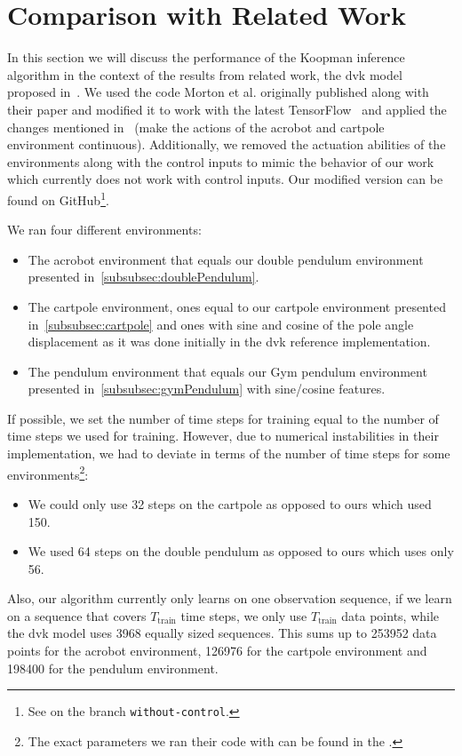 \section{Comparison with Related Work}
	In this section we will discuss the performance of the Koopman inference algorithm in the context of the results from related work, the \ac{dvk} model proposed in~\cite{mortonDeepVariationalKoopman2019a}. We used the code Morton et al. originally published along with their paper and modified it to work with the latest TensorFlow~\cite{abadiTensorFlowLargeScaleMachine2016} and applied the changes mentioned in~\cite{mortonDeepVariationalKoopman2019a} (\ie make the actions of the acrobot and cartpole environment continuous). Additionally, we removed the actuation abilities of the environments along with the control inputs to mimic the behavior of our work which currently does not work with control inputs. Our modified version can be found on GitHub\footnote{See  on the branch \texttt{without-control}.}.

	We ran four different environments:
	\begin{itemize}
		\item The acrobot environment that equals our double pendulum environment presented in~\autoref{subsubsec:doublePendulum}.
		\item The cartpole environment, ones equal to our cartpole environment presented in~\autoref{subsubsec:cartpole} and ones with sine and cosine of the pole angle displacement as it was done initially in the \ac{dvk} reference implementation.
		\item The pendulum environment that equals our Gym pendulum environment presented in~\autoref{subsubsec:gymPendulum} with sine/cosine features.
	\end{itemize}
	If possible, we set the number of time steps for training equal to the number of time steps we used for training. However, due to numerical instabilities in their implementation, we had to deviate in terms of the number of time steps for some environments\footnote{The exact parameters we ran their code with can be found in the .}:
	\begin{itemize}
		\item We could only use 32 steps on the cartpole as opposed to ours which used 150.
		\item We used 64 steps on the double pendulum as opposed to ours which uses only 56.
	\end{itemize}
	Also, our algorithm currently only learns on one observation sequence, \ie if we learn on a sequence that covers \(T_\text{train}\) time steps, we only use \(T_\text{train}\) data points, while the \ac{dvk} model uses \num{3968} equally sized sequences. This sums up to \num{253952} data points for the acrobot environment, \num{126976} for the cartpole environment and \num{198400} for the pendulum environment.

